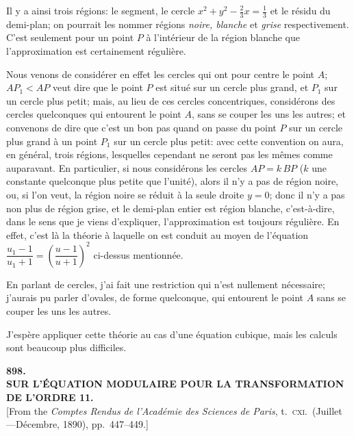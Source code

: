 \documentclass[11pt,a4paper]{article}
\begin{document}
Il y a ainsi trois régions: le segment, le cercle $x^2 + y^2 - \tfrac{2}{3} x = \tfrac{1}{3}$ et le résidu du demi-plan; on pourrait les nommer régions \emph{noire, blanche} et \emph{grise} respectivement. C'est seulement pour un point $P$ à l'intérieur de la région blanche que l'approximation est certainement régulière.

Nous venons de considérer en effet les cercles qui ont pour centre le point $A$; $AP_1 < AP$ veut dire que le point $P$ est situé sur un cercle plus grand, et $P_1$ sur un cercle plus petit; mais, au lieu de ces cercles concentriques, considérons des cercles quelconques qui entourent le point $A$, sans se couper les uns les autres; et convenons de dire que c'est un bon pas quand on passe du point $P$ sur un cercle plus grand à un point $P_1$ sur un cercle plus petit: avec cette convention on aura, en général, trois régions, lesquelles cependant ne seront pas les mêmes comme auparavant. En particulier, si nous considérons les cercles $AP = k\,BP$ ($k$ une constante quelconque plus petite que l'unité), alors il n'y a pas de région noire, ou, si l'on veut, la région noire se réduit à la seule droite $y = 0$; donc il n'y a pas non plus de région grise, et le demi-plan entier est région blanche, c'est-à-dire, dans le sens que je viens d'expliquer, l'approximation est toujours régulière. En effet, c'est là la théorie à laquelle on est conduit au moyen de l'équation $\dfrac{u_1 - 1}{u_1 + 1} = \left(\dfrac{u - 1}{u + 1}\right)^2$ ci-dessus mentionnée.

En parlant de cercles, j'ai fait une restriction qui n'est nullement nécessaire; j'aurais pu parler d'ovales, de forme quelconque, qui entourent le point $A$ sans se couper les uns les autres.

J'espère appliquer cette théorie au cas d'une équation cubique, mais les calculs sont beaucoup plus difficiles.

\clearpage

\begin{center}
{\large\bfseries 898.}\\[0.5em]
{\large\bfseries SUR L'\'EQUATION MODULAIRE POUR LA TRANSFORMATION\\ DE L'ORDRE 11.}\\[0.5em]
\small [From the \emph{Comptes Rendus de l'Acad\'emie des Sciences de Paris}, t.\ \textsc{cxi}.\ (Juillet---D\'ecembre, 1890), pp.\ 447--449.]
\end{center}
\medskip
\end{document}
